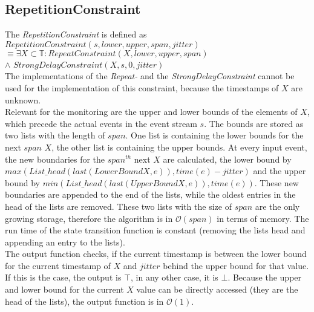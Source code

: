\subsection{RepetitionConstraint}
	The  \emph{RepetitionConstraint} is defined as\\[10pt]
		$RepetitionConstraint(s, lower, upper, span, jitter)$\\
		$\equiv \exists X\subset \mathbb{T}: RepeatConstraint (X, lower, upper, span)$\\
		\hspace{7cm}$\land$ $StrongDelayConstraint(X, s, 0, jitter)$\\[10pt]
	The implementations of the \emph{Repeat-} and the \emph{StrongDelayConstraint} cannot be used for the implementation of this constraint, because the timestamps of $X$ are unknown.\\
	Relevant for the monitoring are the upper and lower bounds of the elements of $X$, which precede the actual events in the event stream $s$. The bounds are stored as two lists with the length of $span$. One list is containing the lower bounds for the next $span$ $X$, the other list is containing the upper bounds. At every input event, the new boundaries for the $span^{th}$ next $X$ are calculated, the lower bound by $max(List\_head(last(LowerBoundX, e)), time(e)-jitter)$ and the upper bound by $min(List\_head(last(UpperBoundX, e)), time(e))$. These new boundaries are appended to the end of the lists, while the oldest entries in the head of the lists are removed. These two lists with the size of $span$ are the only growing storage, therefore the algorithm is in $\mathcal{O}(span)$ in terms of memory. The run time of the state transition function is constant (removing the lists head and appending an entry to the lists).\\
	The output function checks, if the current timestamp is between the lower bound for the current timestamp of $X$ and $jitter$ behind the upper bound for that value. If this is the case, the output is $\top$, in any other case, it is $\bot$. Because the upper and lower bound for the current $X$ value can be directly accessed (they are the head of the lists), the output function is in $\mathcal{O}(1)$.
	
